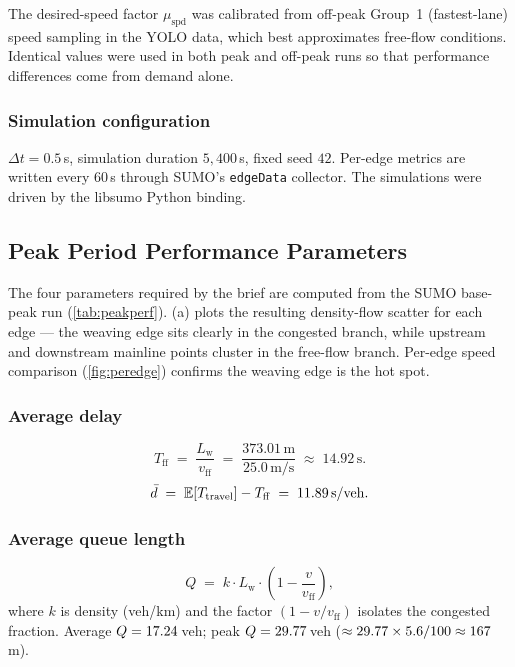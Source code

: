 \documentclass[11pt,a4paper]{article}
\newcommand{\vff}{v_{\mathrm{ff}}}
\newcommand{\Tff}{T_{\mathrm{ff}}}
\begin{document}
The desired-speed factor $\mu_{\text{spd}}$ was calibrated from off-peak Group~1 (fastest-lane) speed sampling in the YOLO data, which best approximates free-flow conditions. Identical values were used in both peak and off-peak runs so that performance differences come from demand alone.

\subsubsection{Simulation configuration}
$\Delta t = 0.5$\,s, simulation duration $5{,}400$\,s, fixed seed $42$. Per-edge metrics are written every 60\,s through SUMO's \texttt{edgeData} collector. The simulations were driven by the libsumo Python binding.

\subsection{Peak Period Performance Parameters}
\label{sec:peakperf}
The four parameters required by the brief are computed from the SUMO base-peak run (\cref{tab:peakperf}).  (a) plots the resulting density-flow scatter for each edge --- the weaving edge sits clearly in the congested branch, while upstream and downstream mainline points cluster in the free-flow branch. Per-edge speed comparison (\cref{fig:peredge}) confirms the weaving edge is the hot spot.

\subsubsection{Average delay}
\begin{equation}
\Tff \;=\; \frac{L_{\mathrm{w}}}{\vff} \;=\; \frac{373.01\,\mathrm{m}}{25.0\,\mathrm{m/s}} \;\approx\; 14.92\,\mathrm{s}.
\label{eq:tff}
\end{equation}
\begin{equation}
\bar{d} \;=\; \mathbb{E}\!\left[T_{\text{travel}}\right] - \Tff \;=\; \dPBaseDelay\,\mathrm{s/veh}.
\label{eq:delay}
\end{equation}

\subsubsection{Average queue length}
\begin{equation}
Q \;=\; k\cdot L_{\mathrm{w}}\cdot \left(1 - \frac{v}{\vff}\right),
\label{eq:queue}
\end{equation}
where $k$ is density (veh/km) and the factor $(1-v/\vff)$ isolates the congested fraction. Average $Q = 17.24$\,veh; peak $Q = 29.77$\,veh ($\approx 29.77\times 5.6 / 100 \approx 167$\,m).
\end{document}
